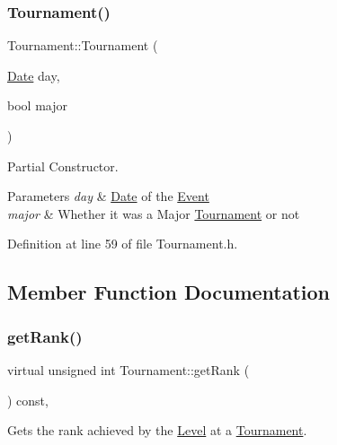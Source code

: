 \subsubsection{\texorpdfstring{Tournament()}{Tournament()}\hspace{0.1cm}{\footnotesize\ttfamily [4/4]}}
{\footnotesize\ttfamily Tournament\+::\+Tournament (\begin{DoxyParamCaption}\item[{\hyperlink{class_date}{Date}}]{day,  }\item[{bool}]{major }\end{DoxyParamCaption})\hspace{0.3cm}{\ttfamily [inline]}}



Partial Constructor. 


\begin{DoxyParams}{Parameters}
{\em day} & \hyperlink{class_date}{Date} of the \hyperlink{class_event}{Event} \\
\hline
{\em major} & Whether it was a Major \hyperlink{class_tournament}{Tournament} or not \\
\hline
\end{DoxyParams}


Definition at line 59 of file Tournament.\+h.



\subsection{Member Function Documentation}
\hypertarget{class_tournament_ae021dc9d9aa7fb8b18bd065bfccc4b7e}{}\label{class_tournament_ae021dc9d9aa7fb8b18bd065bfccc4b7e} 
\subsubsection{\texorpdfstring{get\+Rank()}{getRank()}}
{\footnotesize\ttfamily virtual unsigned int Tournament\+::get\+Rank (\begin{DoxyParamCaption}{ }\end{DoxyParamCaption}) const\hspace{0.3cm}{\ttfamily [inline]}, {\ttfamily [virtual]}}



Gets the rank achieved by the \hyperlink{class_level}{Level} at a \hyperlink{class_tournament}{Tournament}. 

